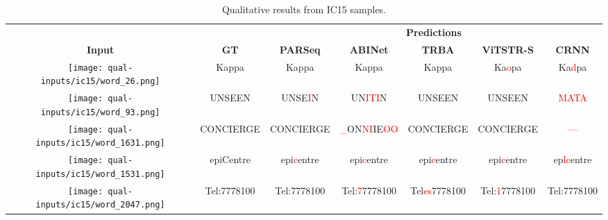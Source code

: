 \begin{table*}[htbp]
  \scriptsize
  \centering
  \setlength\tabcolsep{2pt}
  \caption{Qualitative results from IC15 samples.}
  \begin{tabular}{ c c c c c c c }
    \toprule
    & & \multicolumn{5}{c}{\textbf{Predictions}} \\
    \cmidrule{3-7}
    \textbf{Input} & \textbf{GT} & \textbf{PARSeq} & \textbf{ABINet} & \textbf{TRBA} & \textbf{ViTSTR-S} & \textbf{CRNN} \\
    \midrule
    \texttt{[image: qual-inputs/ic15/word\_26.png]} & Kappa & Kappa & Kappa & Kappa & Ka\textcolor{red}{o}pa & Ka\textcolor{red}{d}pa \\
    \texttt{[image: qual-inputs/ic15/word\_93.png]} & UNSEEN & UNSE\textcolor{red}{I}N & UN\textcolor{red}{ITI}N & UNSEEN & UNSEEN & \textcolor{red}{MATA} \\
    \texttt{[image: qual-inputs/ic15/word\_1631.png]} & CONCIERGE & CONCIERGE & \textcolor{red}{\_}ON\textcolor{red}{NI}IE\textcolor{red}{OO} & CONCIERGE & CONCIERGE & \textcolor{red}{---} \\
    \texttt{[image: qual-inputs/ic15/word\_1531.png]} & epiCentre & epi\textcolor{red}{c}entre & epi\textcolor{red}{c}entre & epi\textcolor{red}{c}entre & epi\textcolor{red}{c}entre & ep\textcolor{red}{lc}entre \\
    \texttt{[image: qual-inputs/ic15/word\_2047.png]} & Tel:7778100 & Tel:7778100 & Tel:\textcolor{red}{7}7778100 & Tel\textcolor{red}{es}7778100 & Tel:\textcolor{red}{1}7778100 & Tel:7778100 \\
    \bottomrule
  \end{tabular}
  \label{tab:qual-results-ic15}
\end{table*}

